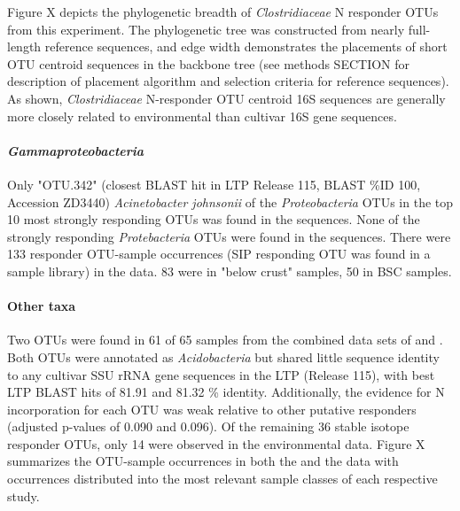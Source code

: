Figure X depicts the phylogenetic breadth of \textit{Clostridiaceae} N responder OTUs from this experiment. The phylogenetic tree was constructed from nearly full-length reference sequences, and edge width demonstrates the placements of short OTU centroid sequences in the backbone tree (see methods SECTION for description of placement algorithm and selection criteria for reference sequences). As shown, \textit{Clostridiaceae} N-responder OTU centroid 16S sequences are generally more closely related to environmental than cultivar 16S gene sequences.   

\paragraph{\textit{Gammaproteobacteria}}
Only "OTU.342" (closest BLAST hit in LTP Release 115, BLAST \%ID 100, Accession ZD3440) \textit{Acinetobacter johnsonii} of the \textit{Proteobacteria} OTUs in the top 10 most strongly responding OTUs was found in the \citet{Garcia_Pichel_2013} sequences. None of the strongly responding \textit{Protebacteria} OTUs were found in the \citet{Steven_2013} sequences. There were 133 responder OTU-sample occurrences (SIP responding OTU was found in a sample library) in the \citet{Steven_2013} data. 83 were in "below crust" samples, 50 in BSC samples.
\paragraph{Other taxa} 
Two OTUs were found in 61 of 65 samples from the combined data sets of \citet{Garcia_Pichel_2013} and \citet{Steven_2013}. Both OTUs were annotated as \textit{Acidobacteria} but shared little sequence identity to any cultivar SSU rRNA gene sequences in the LTP (Release 115), with best LTP BLAST hits of 81.91 and 81.32 \% identity. Additionally, the evidence for N incorporation for each OTU was weak relative to other putative responders (adjusted p-values of 0.090 and 0.096). Of the remaining 36 stable isotope responder OTUs, only 14 were observed in the environmental data. Figure X summarizes the OTU-sample occurrences in both the \citet{Steven_2013} and the \citet{Garcia_Pichel_2013} data with occurrences distributed into the most relevant sample classes of each respective study.

